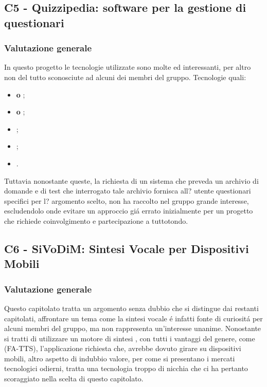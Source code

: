 \subsection{C5 - Quizzipedia: software per la gestione di questionari}
\subsubsection{Valutazione generale}
In questo progetto le tecnologie utilizzate sono molte ed interessanti, per altro non del tutto sconosciute ad alcuni dei membri del gruppo.
Tecnologie quali:
 \begin{itemize}
	\item \textbf{ o };
	\item\textbf{ o };
	\item \textbf{};
	\item \textbf{};
	\item \textbf{}.
\end{itemize}
Tuttavia nonostante queste, la richiesta di un sistema che preveda un archivio di domande e di test che interrogato tale archivio fornisca all? utente questionari specifici per l? argomento scelto, non ha raccolto nel gruppo grande interesse, escludendolo onde evitare un approccio gi\'a errato inizialmente per un progetto che richiede coinvolgimento e partecipazione a tuttotondo.


\subsection{C6 - SiVoDiM: Sintesi Vocale per Dispositivi Mobili}
\subsubsection{Valutazione generale}
Questo capitolato tratta un argomento senza dubbio che si distingue dai restanti capitolati, affrontare un tema come la sintesi vocale \'e infatti fonte di curiosit\'a per alcuni membri del gruppo, ma non rappresenta un'interesse unanime.
Nonostante si tratti di utilizzare un motore di sintesi , con tutti i vantaggi del genere, come  (FA-TTS), l'applicazione richiesta che, avrebbe dovuto girare su dispositivi mobili, altro aspetto di indubbio valore, per come si presentano i mercati tecnologici odierni, tratta una tecnologia troppo di nicchia che ci ha pertanto scoraggiato nella scelta di questo capitolato.

